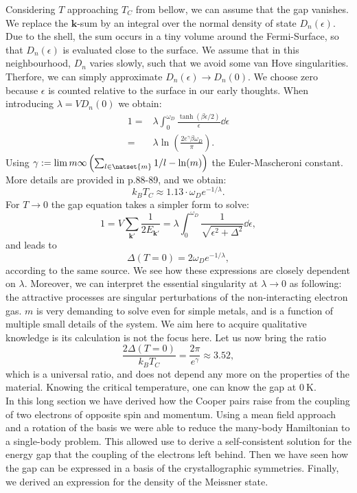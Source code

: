 \documentclass[../main.tex]{subfile}
\begin{document}
Considering $T$ approaching $T_C$ from bellow, we can assume that the gap vanishes. We replace the $\bm{k}$-sum by an integral over the normal 
density of state $D_n(\epsilon)$. Due to the shell, the sum occurs in a tiny volume around the Fermi-Surface, so that $D_n(\epsilon)$ is 
evaluated close to the surface. We assume that in this neighbourhood, $D_n$ varies slowly, such that we avoid some van Hove singularities. Therfore, we can 
simply approximate $D_n(\epsilon) \rightarrow D_n(0)$. We choose zero because $\epsilon$ is counted relative to the surface in our early thoughts. 
When introducing $\lambda = V D_n(0)$ we obtain:
\begin{equation*}
    \begin{aligned}
        1 =& \lambda \int_0^{\omega_D} \frac{\tanh\left(\beta\epsilon/2\right)}{\epsilon} \dd \epsilon\\
        =& \lambda \ln\left(\frac{2e^{\gamma}\beta \omega_D}{\pi}\right).
    \end{aligned}
\end{equation*}
Using $\gamma := \lim{m}{\infty} \left(\sum_{l\in\natset{m}} 1/l - \ln(m)\right)$ the Euler-Mascheroni constant. More details are provided
in \cite{FossheimSudbo2004} p.88-89, and we obtain:
\[
    k_B T_C \approx 1.13\cdot  \omega_D e^{-1/\lambda}.
\]
For $T\rightarrow 0$ the gap equation takes a simpler form to solve:
\begin{equation*}
        1 = V \sum_{\bm{k}'} \frac{1}{2 E_{\bm{k}'}} = \lambda\int_0^{\omega_D}  \frac{1}{\sqrt{\epsilon^2 + \Delta^2}}\dd \epsilon,
\end{equation*}
and leads to 
\[
    \Delta(T=0) = 2 \omega_D e^{-1/\lambda},
\]
according to the same source. We see how these expressions are closely dependent on $\lambda$. Moreover, we can interpret the essential singularity
at $\lambda\rightarrow 0$ as following: the attractive processes are singular perturbations of the non-interacting electron gas.
$m$ is very demanding to solve even for simple metals, and is a function of multiple small details of the system. We aim here 
to acquire qualitative knowledge is its calculation is not the focus here. Let us now bring the ratio
\[
    \frac{2\Delta(T=0)}{k_B T_C} = \frac{2 \pi}{e^{\gamma}} \approx 3.52,
\]  
which is a universal ratio, and does not depend any more on the properties of the material. Knowing the critical temperature, one can know
the gap at $\SI{0}{\kelvin}$.\\

In this long section we have derived how the Cooper pairs raise from the coupling of two electrons of opposite spin and momentum. Using a mean field approach
and a rotation of the basis we were able to reduce the many-body Hamiltonian to a single-body problem. This allowed use to derive a self-consistent solution for 
the energy gap that the coupling of the electrons left behind. Then we have seen how the gap can be expressed in a basis of the crystallographic symmetries.
Finally, we derived an expression for the density of the Meissner state.\\
\end{document}
